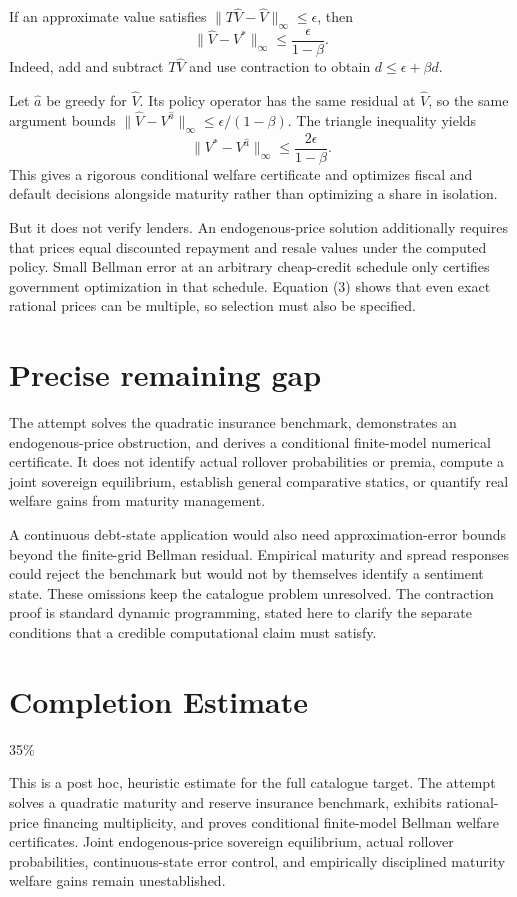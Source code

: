 \documentclass[11pt,a4paper]{article}
\begin{document}
If an approximate value satisfies
$\|T\widehat V-\widehat V\|_\infty\le\epsilon$, then
\[
 \|\widehat V-V^*\|_\infty\le\frac{\epsilon}{1-\beta}.
 \tag{4}
\]
Indeed, add and subtract $T\widehat V$ and use contraction to obtain
$d\le\epsilon+\beta d$.

Let $\widehat a$ be greedy for $\widehat V$. Its policy operator has the same residual at $\widehat V$, so the same argument bounds
$\|\widehat V-V^{\widehat a}\|_\infty\le\epsilon/(1-\beta)$. The triangle inequality yields
\[
 \|V^*-V^{\widehat a}\|_\infty\le\frac{2\epsilon}{1-\beta}.
 \tag{5}
\]
This gives a rigorous conditional welfare certificate and optimizes fiscal and default decisions alongside maturity rather than optimizing a share in isolation.

But it does not verify lenders. An endogenous-price solution additionally requires that prices equal discounted repayment and resale values under the computed policy. Small Bellman error at an arbitrary cheap-credit schedule only certifies government optimization in that schedule. Equation (3) shows that even exact rational prices can be multiple, so selection must also be specified.
\section{Precise remaining gap}
The attempt solves the quadratic insurance benchmark, demonstrates an endogenous-price obstruction, and derives a conditional finite-model numerical certificate. It does not identify actual rollover probabilities or premia, compute a joint sovereign equilibrium, establish general comparative statics, or quantify real welfare gains from maturity management.

A continuous debt-state application would also need approximation-error bounds beyond the finite-grid Bellman residual. Empirical maturity and spread responses could reject the benchmark but would not by themselves identify a sentiment state. These omissions keep the catalogue problem unresolved. The contraction proof is standard dynamic programming, stated here to clarify the separate conditions that a credible computational claim must satisfy.

\section{Completion Estimate}
35\%

This is a post hoc, heuristic estimate for the full catalogue target.
The attempt solves a quadratic maturity and reserve insurance benchmark, exhibits rational-price financing multiplicity, and proves conditional finite-model Bellman welfare certificates. Joint endogenous-price sovereign equilibrium, actual rollover probabilities, continuous-state error control, and empirically disciplined maturity welfare gains remain unestablished.
\end{document}
